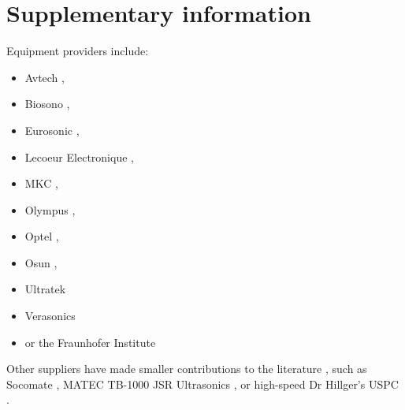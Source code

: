 \section*{Supplementary information}

Equipment providers include:
\begin{itemize}

\item Avtech \cite{qiu_high-resolution_2020,lei_high-frame_nodate},
\item Biosono \cite{biosono_sonolab_nodate,bharath_fpga-based_2015},
\item Eurosonic \cite{jin_optimization_2017, mostavi_application_2017, ranachowski_mechanical_2020, vadalma_smartphone_2020}, 
\item Lecoeur Electronique \cite{lecoeur_bluetooth_nodate, tortoli_ula-op:_2009, zhang_toward_2018, al-aufi_thin_2019},
\item MKC \cite{park_ultrasound_2019},
\item Olympus \cite{veenstra_generating_nodate,choi_versatile_2020,chun_ultrasound_2015,xu_low-cost_2007},
\item Optel \cite{ scholle_pulse_2018, ratajski_application_2017, nowak_evaluation_2020, karjalainen_multi-site_2012},
\item Osun \cite{vadalma_smartphone_2020,bharath_fpga-based_2015}, 
\item Ultratek \cite{veenstra_generating_nodate, perez-sanchez_numerical_2020, chen_ultrasound_2016, wang_preliminary_2019}
\item
Verasonics \cite{peyton_front-end_2017, george_portable_2018, kang_new_2017, hager_ultralight:_2017} 
\item or  the Fraunhofer Institute \cite{zimmermann_highly_2019, zimmermann_miniaturized_2018, zimmermann_high_2018} 
\end{itemize}

Other suppliers have made smaller contributions to the literature \cite{ozdemir_remote_2018}, such as Socomate \cite{gil-alba_morphological_2019}, MATEC TB-1000 \cite{kielczynski_thermophysical_2017} JSR Ultrasonics \cite{cramer_ultrasonic_2015}, or high-speed Dr Hillger's USPC \cite{hillger_high_2016}. 